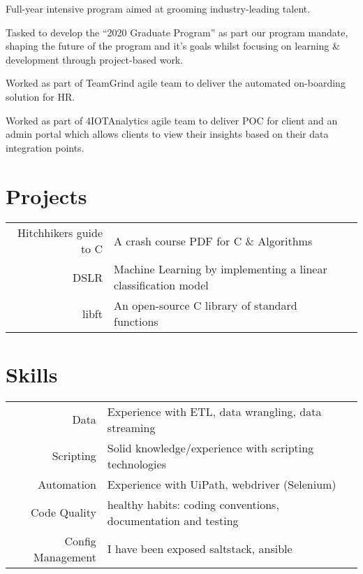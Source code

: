 \documentclass[]{deedy-resume-openfont}
\begin{document}
\begin{minipage}[t]{0.66\textwidth}
\vspace{\topsep} %
\begin{tightemize}
\item Full-year intensive program aimed at grooming industry-leading talent. 
\item Tasked to develop the “2020 Graduate Program” as part our program mandate, shaping the future of the program and it's goals whilst focusing on learning \& development through project-based work.
\item Worked as part of TeamGrind agile team to deliver the automated on-boarding solution for HR.
\item Worked as part of 4IOTAnalytics agile team to deliver POC for client and an admin portal which allows clients to view their insights based on their data integration points.
\end{tightemize}
\sectionsep




\section{Projects} 
\begin{tabular}{rll}
Hitchhikers guide to C	     & A crash course PDF for C \& Algorithms\\
DSLR    & Machine Learning by implementing a linear classification model\\
libft & An open-source C library of standard functions


\end{tabular}
\sectionsep


\section{Skills} 
\begin{tabular}{rll}
Data & Experience with ETL, data wrangling, data streaming \\
Scripting  & Solid knowledge/experience with scripting technologies\\
Automation & Experience with UiPath, webdriver (Selenium) \\
Code Quality	  & healthy habits: coding conventions, documentation and testing\\
Config Management	  & I have been exposed saltstack, ansible\\

\end{tabular}
\sectionsep

\end{minipage} 
\end{document}
